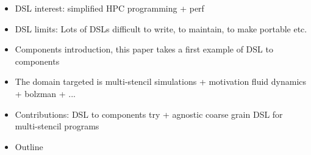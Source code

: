 \begin{itemize}
\item DSL interest: simplified HPC programming + perf
\item DSL limits: Lots of DSLs difficult to write, to maintain, to make portable etc.
\item Components introduction, this paper takes a first example of DSL to components
\item The domain targeted is multi-stencil simulations + motivation fluid dynamics + bolzman + ...
\item Contributions: DSL to components try + agnostic coarse grain DSL for multi-stencil programs
\item Outline
\end{itemize}